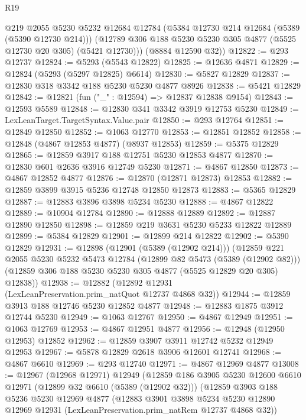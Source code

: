 \begin{lexlean}{R19}
\begin{coremodule}
        @219
        @2055
        @5230
        @5232
        @12684
        @12784
        (@5384 @12730 @214 @12684 (@5389 (@5390 @12730 @214)))
        (@12789 @306 @188 @5230 @5230 @305 @4877 (@5525 @12730 @20 @305) (@5421 @12730)))
      (@8884 @12590 @32))
@12822 := @293 @12737
@12824 := @5293 (@5543 @12822)
@12825 := @12636 @4871
@12829 := @12824 (@5293 (@5297 @12825) @6614)
@12830 := @5827 @12829
@12837 := @12830 @318 @3342 @188 @5230 @5230 @4877 @8926
@12838 := @5421 @12829
@12842 := @12821 (fun ("_" : @12594) => @12837 @12838 @9154)
@12843 := @12593 @5589
@12848 := @12830 @341 @3342 @3919 @12753 @5230
@12849 := LexLeanTarget.TargetSyntax.Value.pair
@12850 := @293 @12764
@12851 := @12849 @12850
@12852 := @1063 @12770
@12853 := @12851 @12852
@12858 := @12848 (@4867 @12853 @4877) (@8937 @12853)
@12859 := @5375 @12829
@12865 := @12859 @3917 @188 @12751 @5230 @12853 @4877
@12870 := @12830 @601 @2636 @3916 @12749 @5230
@12871 := @4867 @12850
@12873 := @4867 @12852 @4877
@12876 := @12870 (@12871 @12873) @12853
@12882 := @12859 @3899 @3915 @5236 @12748 @12850 @12873
@12883 := @5365 @12829
@12887 := @12883 @3896 @3898 @5234 @5230
@12888 := @4867 @12822
@12889 := @10904 @12784
@12890 := @12888 @12889
@12892 := @12887 @12890 @12850
@12898 := @12859 @219 @3631 @5230 @5233 @12822 @12889
@12899 := @5384 @12829
@12901 := @12899 @214 @12822
@12902 := @5390 @12829
@12931 := @12898
    (@12901 (@5389 (@12902 @214)))
    (@12859
      @221
      @2055
      @5230
      @5232
      @5473
      @12784
      (@12899 @82 @5473 (@5389 (@12902 @82)))
      (@12859 @306 @188 @5230 @5230 @305 @4877 (@5525 @12829 @20 @305) @12838))
@12938 := @12882 (@12892 @12931 (LexLeanPreservation.prim_natQuot @12737 @4868 @32))
@12944 := @12859 @3913 @188 @12746 @5230 @12852 @4877
@12948 := @12883 @1875 @3912 @12744 @5230
@12949 := @1063 @12767
@12950 := @4867 @12949
@12951 := @1063 @12769
@12953 := @4867 @12951 @4877
@12956 := @12948 (@12950 @12953) @12852
@12962 := @12859 @3907 @3911 @12742 @5232 @12949 @12953
@12967 := @5878 @12829 @2618 @3906 @12601 @12741
@12968 := @4867 @6610
@12969 := @293 @12740
@12971 := @4867 @12969 @4877
@13008 := @12967
    (@12968 @12971)
    @12949
    (@12859
      @186
      @3905
      @5230
      @12600
      @6610
      @12971
      (@12899 @32 @6610 (@5389 (@12902 @32)))
      (@12859
        @3903
        @188
        @5236
        @5230
        @12969
        @4877
        (@12883
          @3901
          @3898
          @5234
          @5230
          @12890
          @12969
          @12931
          (LexLeanPreservation.prim_natRem @12737 @4868 @32))

\end{coremodule}
\end{lexlean}
